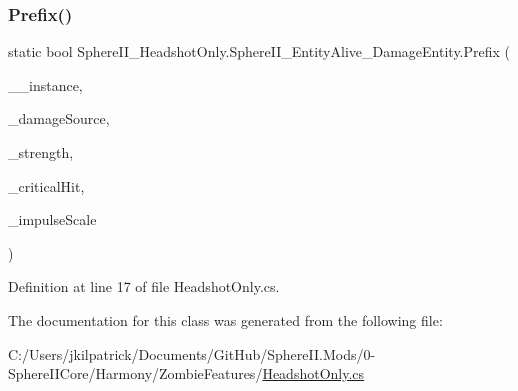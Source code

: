 \subsubsection{\texorpdfstring{Prefix()}{Prefix()}}
{\footnotesize\ttfamily static bool Sphere\+I\+I\+\_\+\+Headshot\+Only.\+Sphere\+I\+I\+\_\+\+Entity\+Alive\+\_\+\+Damage\+Entity.\+Prefix (\begin{DoxyParamCaption}\item[{Entity\+Alive}]{\+\_\+\+\_\+instance,  }\item[{ref Damage\+Source}]{\+\_\+damage\+Source,  }\item[{ref int}]{\+\_\+strength,  }\item[{bool}]{\+\_\+critical\+Hit,  }\item[{float}]{\+\_\+impulse\+Scale }\end{DoxyParamCaption})\hspace{0.3cm}{\ttfamily [static]}}



Definition at line 17 of file Headshot\+Only.\+cs.



The documentation for this class was generated from the following file\+:\begin{DoxyCompactItemize}
\item 
C\+:/\+Users/jkilpatrick/\+Documents/\+Git\+Hub/\+Sphere\+I\+I.\+Mods/0-\/\+Sphere\+I\+I\+Core/\+Harmony/\+Zombie\+Features/\mbox{\hyperlink{_headshot_only_8cs}{Headshot\+Only.\+cs}}\end{DoxyCompactItemize}
